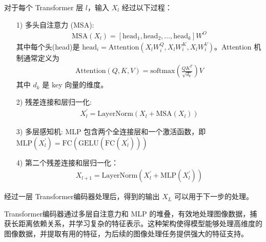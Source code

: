 \documentclass[a4paper]{ctexart}
\begin{document}
对于每个 Transformer 层 $l$，输入 $X_l$ 经过以下过程：
	
\begin{itemize}
	\item[1)] 
	多头自注意力 (MSA):
	\begin{equation}
		\begin{aligned}
			\text{MSA}(X_l) = [\text{head}_1, \text{head}_2, \ldots, \text{head}_k] W^{O}
		\end{aligned}
		\label{eq: MSA}
	\end{equation}
	其中每个头(head)是 $\text{head}_i = \text{Attention}\left(X_l W_i^Q, X_l W_i^K, X_l W_i^V \right)$。Attention 机制通常定义为
	\begin{equation}
		\begin{aligned}
			\text{Attention}(Q, K, V) = \text{softmax} \left(\frac{QK^T}{\sqrt{d_k}} \right) V
		\end{aligned}
		\label{eq: Attention}
	\end{equation}
	其中 $d_k$ 是 key 向量的维度。
		
	\item[2)]
	残差连接和层归一化:
	\begin{equation}
		\begin{aligned}
			X_l^\prime = \text{LayerNorm} \left(X_l + \text{MSA}(X_l)\right)
		\end{aligned}
		\label{eq: Residual Connection}
	\end{equation}
	
	\item[3)]
	多层感知机:
	MLP 包含两个全连接层和一个激活函数，即 $\text{MLP} (X_l^\prime) = \text{FC}\left(\text{GELU}\left(\text{FC}(X_l^\prime)\right)\right)$
		
	\item[4)]
	第二个残差连接和层归一化：
	\begin{equation}
		\begin{aligned}
			\displaystyle X_{l+1} = \text{LayerNorm} (X_l^\prime + \text{MLP}(X_l^\prime))
		\end{aligned}
		\label{eq: layernorm}
	\end{equation}
\end{itemize}
	
经过一层 Transformer编码器处理后，得到的输出 $X_L$ 可以用于下一步的处理。
	
Transformer编码器通过多层自注意力和 MLP 的堆叠，有效地处理图像数据，捕获长距离依赖关系，并学习复杂的特征表示。这种架构使得模型能够处理高维度的图像数据，并提取有用的特征，为后续的图像处理任务提供强大的特征支持。
	
\end{document}
